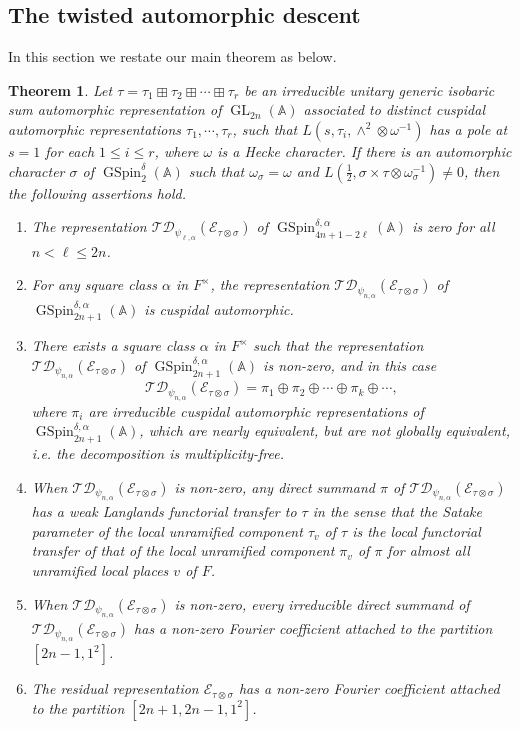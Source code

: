 \documentclass[12pt]{amsart}
\newcommand{\A}{\mathbb{A}}
\newcommand{\TD}{\mathcal{TD}}
\newcommand{\CE}{{\mathcal{E}}}
\newtheorem{theorem}{Theorem}[section]
\theoremstyle{remark}
\DeclareMathOperator{\GL}{GL}
\DeclareMathOperator{\GSpin}{GSpin}
\begin{document}
\subsection{The twisted automorphic descent}
\label{subsection-twisted-auto-descent}
In this section we restate our main theorem as below. 
\begin{theorem}\label{thm-Main}
 Let $\tau=\tau_1\boxplus \tau_2\boxplus \cdots \boxplus \tau_r$ be an irreducible unitary generic isobaric sum automorphic representation of $\GL_{2n}(\A)$ associated to distinct cuspidal automorphic representations $\tau_1, \cdots, \tau_r$, such that $L(s, \tau_i, \wedge^2\otimes\omega^{-1})$ has a pole at $s=1$ for each $1\le i\le r$, where $\omega$ is a Hecke character. 
 If there is an automorphic character $\sigma$ of $\GSpin^\delta_2(\A)$ such that $\omega_{\sigma}=\omega$ and 
 $L(\frac{1}{2}, \sigma\times \tau\otimes \omega_\sigma^{-1})\neq 0$, then the following assertions hold.
\begin{enumerate}
\item The representation $\TD_{\psi_{\ell,\alpha}}(\CE_{\tau\otimes\sigma})$ of $\GSpin^{\delta,\alpha}_{4n+1-2\ell}(\A)$ is zero
for all $n<\ell\leq 2n$.
\item For any square class $\alpha$ in $F^\times$, the representation $\TD_{\psi_{n,\alpha}}(\CE_{\tau\otimes\sigma})$ of $\GSpin^{\delta,\alpha}_{2n+1}(\A)$ is cuspidal automorphic.
\item There exists a square class $\alpha$ in $F^\times$ such that the representation $\TD_{\psi_{n,\alpha}}(\CE_{\tau\otimes\sigma})$ of $\GSpin^{\delta,\alpha}_{2n+1}(\A)$ is non-zero, and in this case
    $$
    \TD_{\psi_{n,\alpha}}(\CE_{\tau\otimes\sigma})=\pi_1\oplus\pi_2\oplus\cdots\oplus\pi_k\oplus\cdots,
    $$
    where $\pi_i$ are irreducible cuspidal automorphic representations of $\GSpin^{\delta,\alpha}_{2n+1}(\A)$, which are nearly equivalent, but
    are not globally equivalent, i.e. the decomposition is multiplicity-free.
\item When $\TD_{\psi_{n,\alpha}}(\CE_{\tau\otimes\sigma})$ is non-zero, any direct summand $\pi$ of $\TD_{\psi_{n,\alpha}}(\CE_{\tau\otimes\sigma})$ has a weak Langlands functorial transfer to $\tau$ in the sense that the Satake parameter of the local unramified component $\tau_v$ of $\tau$ is the local functorial transfer of that of the local unramified component $\pi_v$ of $\pi$ for almost all unramified local places $v$ of $F$.
\item When $\TD_{\psi_{n,\alpha}}(\CE_{\tau\otimes\sigma})$ is non-zero, every irreducible direct summand of $\TD_{\psi_{n,\alpha}}(\CE_{\tau\otimes\sigma})$ has a non-zero Fourier coefficient attached to the partition $[2n-1,1^2]$.  
\item The residual representation $\CE_{\tau\otimes\sigma}$ has a non-zero Fourier coefficient attached to the partition $[2n+1,2n-1,1^2]$.  
\end{enumerate}
\end{theorem}
\end{document}
